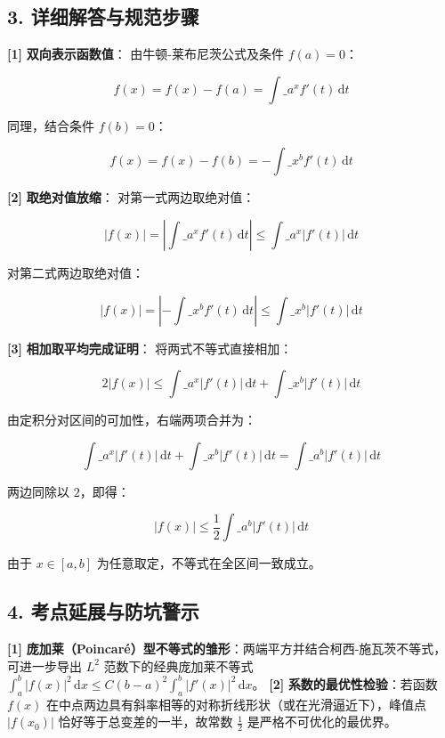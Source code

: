 \documentclass[11pt,a4paper,UTF8]{ctexart}
\begin{document}
\subsection{3. 详细解答与规范步骤}
\begin{solbox}[分步推导与答题规范]
\textbf{[1]}  \textbf{双向表示函数值}：
由牛顿-莱布尼茨公式及条件 $f(a) = 0$：

\begin{equation*}
f(x) = f(x) - f(a) = \int\_a^x f'(t)\,\mathrm{d}t
\end{equation*}

同理，结合条件 $f(b) = 0$：

\begin{equation*}
f(x) = f(x) - f(b) = -\int\_x^b f'(t)\,\mathrm{d}t
\end{equation*}


\textbf{[2]}  \textbf{取绝对值放缩}：
对第一式两边取绝对值：

\begin{equation*}
|f(x)| = \left| \int\_a^x f'(t)\,\mathrm{d}t \right| \le \int\_a^x |f'(t)|\,\mathrm{d}t
\end{equation*}

对第二式两边取绝对值：

\begin{equation*}
|f(x)| = \left| -\int\_x^b f'(t)\,\mathrm{d}t \right| \le \int\_x^b |f'(t)|\,\mathrm{d}t
\end{equation*}


\textbf{[3]}  \textbf{相加取平均完成证明}：
将两式不等式直接相加：

\begin{equation*}
2|f(x)| \le \int\_a^x |f'(t)|\,\mathrm{d}t + \int\_x^b |f'(t)|\,\mathrm{d}t
\end{equation*}

由定积分对区间的可加性，右端两项合并为：

\begin{equation*}
\int\_a^x |f'(t)|\,\mathrm{d}t + \int\_x^b |f'(t)|\,\mathrm{d}t = \int\_a^b |f'(t)|\,\mathrm{d}t
\end{equation*}

两边同除以 $2$，即得：

\begin{equation*}
|f(x)| \le \frac{1}{2}\int\_a^b |f'(t)|\,\mathrm{d}t
\end{equation*}

由于 $x \in [a, b]$ 为任意取定，不等式在全区间一致成立。
\end{solbox}


\subsection{4. 考点延展与防坑警示}
\begin{solbox}[分步推导与答题规范]
\textbf{[1]}  \textbf{庞加莱（Poincaré）型不等式的雏形}：两端平方并结合柯西-施瓦茨不等式，可进一步导出 $L^2$ 范数下的经典庞加莱不等式 $\int_a^b |f(x)|^2\,\mathrm{d}x \le C (b-a)^2 \int_a^b |f'(x)|^2\,\mathrm{d}x$。
\textbf{[2]}  \textbf{系数的最优性检验}：若函数 $f(x)$ 在中点两边具有斜率相等的对称折线形状（或在光滑逼近下），峰值点 $|f(x_0)|$ 恰好等于总变差的一半，故常数 $\frac{1}{2}$ 是严格不可优化的最优界。
\end{solbox}
\end{document}
